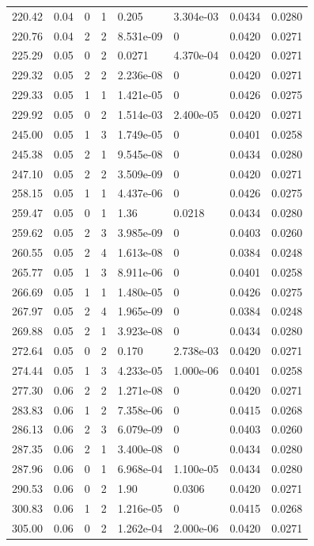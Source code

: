 \documentclass[preview]{standalone}
\begin{document}
{{{\begin{tabular}{L{1.2cm}C{1.2cm} C{0.3cm}C{0.5cm} C{1.4cm}C{1.4cm} C{1.4cm}C{1.4cm}}
  220.42  &  0.04  & 0     &  1 &  0.205  & 3.304e-03  & 0.0434 &  0.0280   \\ 
  220.76  &  0.04  & 2     &  2 &  8.531e-09  & 0  & 0.0420 &  0.0271   \\ 
  225.29  &  0.05  & 0     &  2 &  0.0271  & 4.370e-04  & 0.0420 &  0.0271   \\ 
  229.32  &  0.05  & 2     &  2 &  2.236e-08  & 0  & 0.0420 &  0.0271   \\ 
  229.33  &  0.05  & 1     &  1 &  1.421e-05  & 0  & 0.0426 &  0.0275   \\ 
  229.92  &  0.05  & 0     &  2 &  1.514e-03  & 2.400e-05  & 0.0420 &  0.0271   \\ 
  245.00  &  0.05  & 1     &  3 &  1.749e-05  & 0  & 0.0401 &  0.0258   \\ 
  245.38  &  0.05  & 2     &  1 &  9.545e-08  & 0  & 0.0434 &  0.0280   \\ 
  247.10  &  0.05  & 2     &  2 &  3.509e-09  & 0  & 0.0420 &  0.0271   \\ 
  258.15  &  0.05  & 1     &  1 &  4.437e-06  & 0  & 0.0426 &  0.0275   \\ 
  259.47  &  0.05  & 0     &  1 &  1.36  & 0.0218  & 0.0434 &  0.0280   \\ 
  259.62  &  0.05  & 2     &  3 &  3.985e-09  & 0  & 0.0403 &  0.0260   \\ 
  260.55  &  0.05  & 2     &  4 &  1.613e-08  & 0  & 0.0384 &  0.0248   \\ 
  265.77  &  0.05  & 1     &  3 &  8.911e-06  & 0  & 0.0401 &  0.0258   \\ 
  266.69  &  0.05  & 1     &  1 &  1.480e-05  & 0  & 0.0426 &  0.0275   \\ 
  267.97  &  0.05  & 2     &  4 &  1.965e-09  & 0  & 0.0384 &  0.0248   \\ 
  269.88  &  0.05  & 2     &  1 &  3.923e-08  & 0  & 0.0434 &  0.0280   \\ 
  272.64  &  0.05  & 0     &  2 &  0.170  & 2.738e-03  & 0.0420 &  0.0271   \\ 
  274.44  &  0.05  & 1     &  3 &  4.233e-05  & 1.000e-06  & 0.0401 &  0.0258   \\ 
  277.30  &  0.06  & 2     &  2 &  1.271e-08  & 0  & 0.0420 &  0.0271   \\ 
  283.83  &  0.06  & 1     &  2 &  7.358e-06  & 0  & 0.0415 &  0.0268   \\ 
  286.13  &  0.06  & 2     &  3 &  6.079e-09  & 0  & 0.0403 &  0.0260   \\ 
  287.35  &  0.06  & 2     &  1 &  3.400e-08  & 0  & 0.0434 &  0.0280   \\ 
  287.96  &  0.06  & 0     &  1 &  6.968e-04  & 1.100e-05  & 0.0434 &  0.0280   \\ 
  290.53  &  0.06  & 0     &  2 &  1.90  & 0.0306  & 0.0420 &  0.0271   \\ 
  300.83  &  0.06  & 1     &  2 &  1.216e-05  & 0  & 0.0415 &  0.0268   \\ 
  305.00  &  0.06  & 0     &  2 &  1.262e-04  & 2.000e-06  & 0.0420 &  0.0271   \\ 
\hline 
\end{tabular} 

}}}
\end{document}
